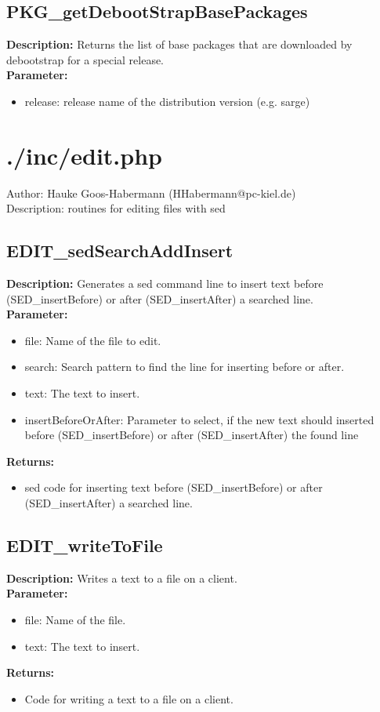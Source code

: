 \subsection{PKG\_getDebootStrapBasePackages}
\textbf{Description:} Returns the list of base packages that are downloaded by debootstrap for a special release.\\
\textbf{Parameter:}
\begin{itemize}
\item release: release name of the distribution version (e.g. sarge)
\end{itemize}

\newpage\section{./inc/edit.php}
 Author: Hauke Goos-Habermann (HHabermann@pc-kiel.de)\\
 Description: routines for editing files with sed\\

\subsection{EDIT\_sedSearchAddInsert}
\textbf{Description:} Generates a sed command line to insert text before (SED\_insertBefore) or after (SED\_insertAfter) a searched line.\\
\textbf{Parameter:}
\begin{itemize}
\item file: Name of the file to edit.
\item search: Search pattern to find the line for inserting before or after.
\item text: The text to insert.
\item insertBeforeOrAfter: Parameter to select, if the new text should inserted before (SED\_insertBefore) or after (SED\_insertAfter) the found line
\end{itemize}
\textbf{Returns:}
\begin{itemize}
\item sed code for inserting text before (SED\_insertBefore) or after (SED\_insertAfter) a searched line.
\end{itemize}

\subsection{EDIT\_writeToFile}
\textbf{Description:} Writes a text to a file on a client.\\
\textbf{Parameter:}
\begin{itemize}
\item file: Name of the file.
\item text: The text to insert.
\end{itemize}
\textbf{Returns:}
\begin{itemize}
\item Code for writing a text to a file on a client.
\end{itemize}

